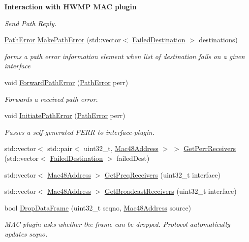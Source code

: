 \begin{Indent}{\bf Interaction with H\+W\+MP M\+AC plugin}
\begin{DoxyCompactItemize}
\begin{DoxyCompactList}\small\item\em Send Path Reply. \end{DoxyCompactList}\item 
\hyperlink{structns3_1_1dot11s_1_1HwmpProtocol_1_1PathError}{Path\+Error} \hyperlink{classns3_1_1dot11s_1_1HwmpProtocol_a214ed61f71ad4537ccb10189d04b981f}{Make\+Path\+Error} (std\+::vector$<$ \hyperlink{structns3_1_1dot11s_1_1HwmpProtocol_1_1FailedDestination}{Failed\+Destination} $>$ destinations)
\begin{DoxyCompactList}\small\item\em forms a path error information element when list of destination fails on a given interface \end{DoxyCompactList}\item 
void \hyperlink{classns3_1_1dot11s_1_1HwmpProtocol_aab1705e003bfb1e6ebc4ae4dd7f61958}{Forward\+Path\+Error} (\hyperlink{structns3_1_1dot11s_1_1HwmpProtocol_1_1PathError}{Path\+Error} perr)
\begin{DoxyCompactList}\small\item\em Forwards a received path error. \end{DoxyCompactList}\item 
void \hyperlink{classns3_1_1dot11s_1_1HwmpProtocol_aa096a2aa2d9bae96602e9f4c8547cb4f}{Initiate\+Path\+Error} (\hyperlink{structns3_1_1dot11s_1_1HwmpProtocol_1_1PathError}{Path\+Error} perr)
\begin{DoxyCompactList}\small\item\em Passes a self-\/generated P\+E\+RR to interface-\/plugin. \end{DoxyCompactList}\item 
std\+::vector$<$ std\+::pair$<$ uint32\+\_\+t, \hyperlink{classns3_1_1Mac48Address}{Mac48\+Address} $>$ $>$ \hyperlink{classns3_1_1dot11s_1_1HwmpProtocol_ae0b4e176bf1e9251f6637794dbfbd6cb}{Get\+Perr\+Receivers} (std\+::vector$<$ \hyperlink{structns3_1_1dot11s_1_1HwmpProtocol_1_1FailedDestination}{Failed\+Destination} $>$ failed\+Dest)
\item 
std\+::vector$<$ \hyperlink{classns3_1_1Mac48Address}{Mac48\+Address} $>$ \hyperlink{classns3_1_1dot11s_1_1HwmpProtocol_a0983e62bfc5f01daccfe09d04208c297}{Get\+Preq\+Receivers} (uint32\+\_\+t interface)
\item 
std\+::vector$<$ \hyperlink{classns3_1_1Mac48Address}{Mac48\+Address} $>$ \hyperlink{classns3_1_1dot11s_1_1HwmpProtocol_acaab4681cd6b7901ffd5a5f88dc113e2}{Get\+Broadcast\+Receivers} (uint32\+\_\+t interface)
\item 
bool \hyperlink{classns3_1_1dot11s_1_1HwmpProtocol_aed13121f964aae5958d34e1503c151af}{Drop\+Data\+Frame} (uint32\+\_\+t seqno, \hyperlink{classns3_1_1Mac48Address}{Mac48\+Address} source)
\begin{DoxyCompactList}\small\item\em M\+A\+C-\/plugin asks whether the frame can be dropped. Protocol automatically updates seqno. \end{DoxyCompactList}\end{DoxyCompactItemize}
\end{Indent}
